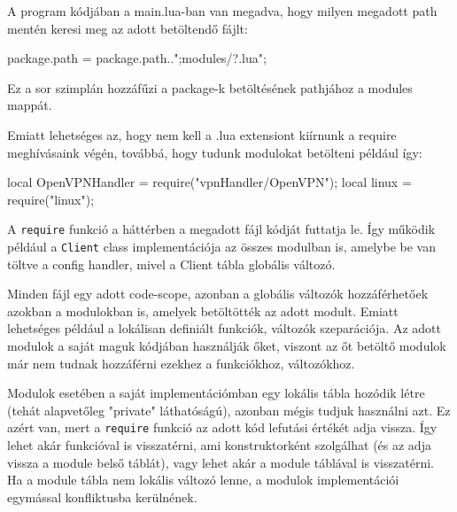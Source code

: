 A program kódjában a main.lua-ban van megadva, hogy milyen megadott path mentén keresi meg az adott betöltendő fájlt:

\begin{lua}
package.path = package.path..";modules/?.lua";
\end{lua}

Ez a sor szimplán hozzáfűzi a package-k betöltésének pathjához a modules mappát.

Emiatt lehetséges az, hogy nem kell a .lua extensiont kiírnunk a require meghívásaink végén, továbbá, hogy tudunk modulokat betölteni például így:
\begin{lua}
local OpenVPNHandler = require("vpnHandler/OpenVPN");
local linux = require("linux");
\end{lua}

A \texttt{require} funkció a háttérben a megadott fájl kódját futtatja le. Így működik például a \texttt{Client} class implementációja az összes modulban is, amelybe be van töltve a config handler, mivel a Client tábla globális változó. 

Minden fájl egy adott code-scope, azonban a globális változók hozzáférhetőek azokban a modulokban is, amelyek betöltötték az adott modult. Emiatt lehetséges például a lokálisan definiált funkciók, változók szeparációja. Az adott modulok a saját maguk kódjában használják őket, viszont az őt betöltő modulok már nem tudnak hozzáférni ezekhez a funkciókhoz, változókhoz.

Modulok esetében a saját implementációmban egy lokális tábla hozódik létre (tehát alapvetőleg "private" láthatóságú), azonban mégis tudjuk használni azt. Ez azért van, mert a \texttt{require} funkció az adott kód lefutási értékét adja vissza. Így lehet akár funkcióval is visszatérni, ami konstruktorként szolgálhat (és az adja vissza a module belső táblát), vagy lehet akár a module táblával is visszatérni. Ha a module tábla nem lokális változó lenne, a modulok implementációi egymással konfliktusba kerülnének.